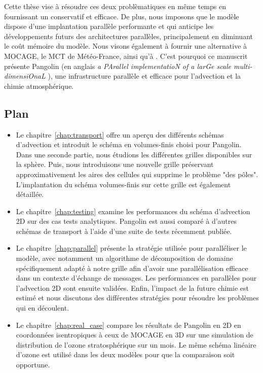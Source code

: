 Cette thèse vise à résoudre ces deux problèmatiques en même temps en fournissant
un \DIFdelbegin {}\DIFdelend \DIFaddbegin {}\DIFaddend conservatif et efficace. De plus, nous imposons que
le modèle dispose d'une implantation parallèle performante et qui anticipe les
développements futurs des architectures parallèles, principalement en diminuant
le coût mémoire du modèle. Nous visons également à \DIFaddbegin {}\DIFaddend fournir une alternative à MOCAGE, le MCT de
Météo-France, ainsi qu'à \DIFdelbegin {}\DIFdelend . C'est pourquoi ce manuscrit présente Pangolin (en
anglais \textit{a PArallel implementatioN of a larGe scale multi-dimensiOnaL
\DIFdelbegin {}\DIFdelend \DIFaddbegin {}\DIFaddend }), une infrastructure parallèle et efficace
pour l'advection et la chimie atmosphérique.


\subsection*{Plan}
\begin{itemize}
  \item Le chapitre~\ref{chap:transport} offre un aperçu des différents schémas
  d'advection et introduit le schéma en volumes-finis choisi pour Pangolin. Dans
  une seconde partie, nous étudions les différentes grilles disponibles sur la
  sphère. Puis, nous introduisons une nouvelle grille préservant
  approximativement les aires des cellules qui supprime le problème "des pôles".
  L'implantation du schéma volumes-finis sur cette grille est également
  détaillée.
  \item Le chapitre~\ref{chap:testing} examine les performances du schéma
  d'advection 2D sur des cas tests analytiques. Pangolin est aussi comparé à
  d'autres schémas de transport à l'aide d'une suite de tests récemment publiée.
  \item Le chapitre~\ref{chap:parallel} présente la stratégie utilisée pour
  paralléliser le modèle, avec notamment un algorithme de décomposition de
  domaine spécifiquement adapté à notre grille afin d'avoir une parallélisation
  efficace dans un contexte d'échange de messages. Les performances en
  parallèles pour l'advection 2D sont ensuite validées. Enfin, l'impact de la
  future chimie est estimé et nous discutons des différentes stratégies pour
  résoudre les problèmes qui en découlent.
  \item Le chapitre~\ref{chap:real_case} compare les résultats de Pangolin en 2D
    en coordonnées isentropiques à ceux de MOCAGE en 3D sur une simulation de
  distribution de l'ozone stratosphérique sur un mois. Le même schéma
  linéaire d'ozone est utilisé dans les deux modèles pour que la comparaison
  soit opportune.
\end{itemize}

